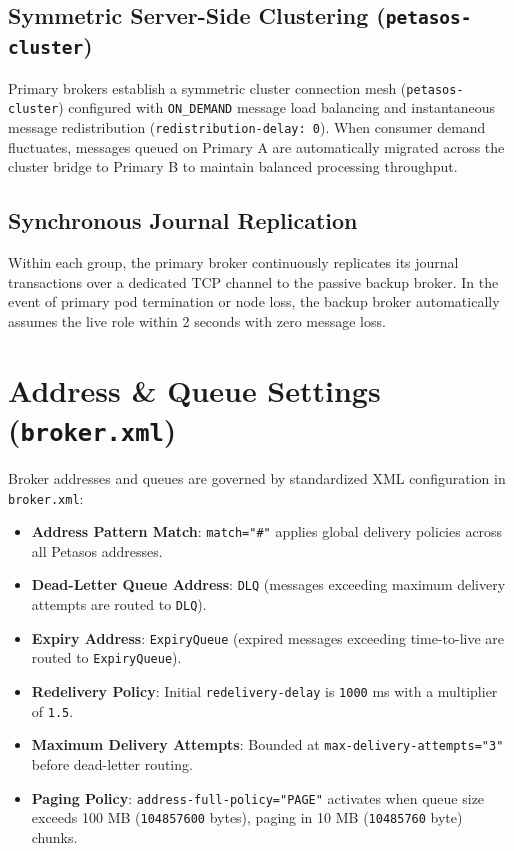 \subsection{Symmetric Server-Side Clustering (\texttt{petasos-cluster})}
Primary brokers establish a symmetric cluster connection mesh (\texttt{petasos-cluster}) configured with \texttt{ON\_DEMAND} message load balancing and instantaneous message redistribution (\texttt{redistribution-delay: 0}). When consumer demand fluctuates, messages queued on Primary A are automatically migrated across the cluster bridge to Primary B to maintain balanced processing throughput.

\subsection{Synchronous Journal Replication}
Within each group, the primary broker continuously replicates its journal transactions over a dedicated TCP channel to the passive backup broker. In the event of primary pod termination or node loss, the backup broker automatically assumes the live role within 2 seconds with zero message loss.

\section{Address \& Queue Settings (\texttt{broker.xml})}

Broker addresses and queues are governed by standardized XML configuration in \texttt{broker.xml}:
\begin{itemize}
    \item \textbf{Address Pattern Match}: \texttt{match="\#"} applies global delivery policies across all Petasos addresses.
    \item \textbf{Dead-Letter Queue Address}: \texttt{DLQ} (messages exceeding maximum delivery attempts are routed to \texttt{DLQ}).
    \item \textbf{Expiry Address}: \texttt{ExpiryQueue} (expired messages exceeding time-to-live are routed to \texttt{ExpiryQueue}).
    \item \textbf{Redelivery Policy}: Initial \texttt{redelivery-delay} is \texttt{1000} ms with a multiplier of \texttt{1.5}.
    \item \textbf{Maximum Delivery Attempts}: Bounded at \texttt{max-delivery-attempts="3"} before dead-letter routing.
    \item \textbf{Paging Policy}: \texttt{address-full-policy="PAGE"} activates when queue size exceeds 100 MB (\texttt{104857600} bytes), paging in 10 MB (\texttt{10485760} byte) chunks.
\end{itemize}

